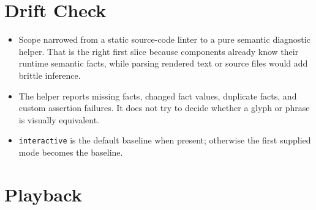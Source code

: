 \section{Drift Check}\label{record-126-drift-check}

\begin{itemize}
\tightlist
\item
  Scope narrowed from a static source-code linter to a pure semantic diagnostic helper. That is the right first slice because components already know their runtime semantic facts, while parsing rendered text or source files would add brittle inference.
\item
  The helper reports missing facts, changed fact values, duplicate facts, and custom assertion failures. It does not try to decide whether a glyph or phrase is visually equivalent.
\item
  \texttt{i\allowbreak{}n\allowbreak{}t\allowbreak{}e\allowbreak{}r\allowbreak{}a\allowbreak{}c\allowbreak{}t\allowbreak{}i\allowbreak{}v\allowbreak{}e} is the default baseline when present; otherwise the first supplied mode becomes the baseline.
\end{itemize}

\section{Playback}\label{record-126-playback}

